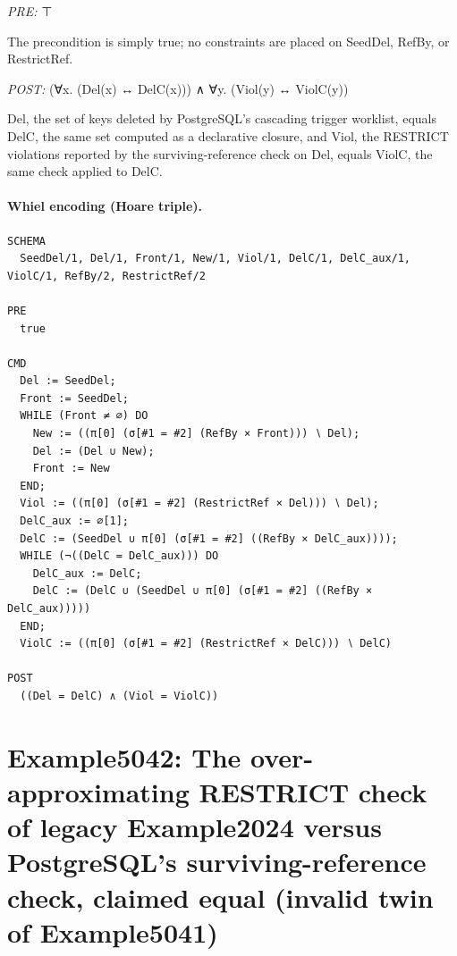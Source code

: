 \documentclass[10pt]{article}
\begin{document}
\textit{PRE:} ⊤\par The precondition is simply true; no constraints are placed on SeedDel, RefBy, or RestrictRef.

\textit{POST:} (∀x. (Del(x) ↔ DelC(x))) ∧ ∀y. (Viol(y) ↔ ViolC(y))\par Del, the set of keys deleted by PostgreSQL's cascading trigger worklist, equals DelC, the same set computed as a declarative closure, and Viol, the RESTRICT violations reported by the surviving-reference check on Del, equals ViolC, the same check applied to DelC.

\paragraph{Whiel encoding (Hoare triple).}

\begin{Verbatim}[fontsize=\scriptsize,breaklines=true,breakanywhere=true,frame=single,framesep=1.5mm]
SCHEMA
  SeedDel/1, Del/1, Front/1, New/1, Viol/1, DelC/1, DelC_aux/1, ViolC/1, RefBy/2, RestrictRef/2

PRE
  true

CMD
  Del := SeedDel;
  Front := SeedDel;
  WHILE (Front ≠ ∅) DO
    New := ((π[0] (σ[#1 = #2] (RefBy × Front))) ∖ Del);
    Del := (Del ∪ New);
    Front := New
  END;
  Viol := ((π[0] (σ[#1 = #2] (RestrictRef × Del))) ∖ Del);
  DelC_aux := ∅[1];
  DelC := (SeedDel ∪ π[0] (σ[#1 = #2] ((RefBy × DelC_aux))));
  WHILE (¬((DelC = DelC_aux))) DO
    DelC_aux := DelC;
    DelC := (DelC ∪ (SeedDel ∪ π[0] (σ[#1 = #2] ((RefBy × DelC_aux)))))
  END;
  ViolC := ((π[0] (σ[#1 = #2] (RestrictRef × DelC))) ∖ DelC)

POST
  ((Del = DelC) ∧ (Viol = ViolC))
\end{Verbatim}

\Needspace{0.45\textheight}

\section{Example5042: The over-approximating RESTRICT check of legacy Example2024 versus PostgreSQL's surviving-reference check, claimed equal (invalid twin of Example5041)}\label{case:Example5042}
\end{document}
